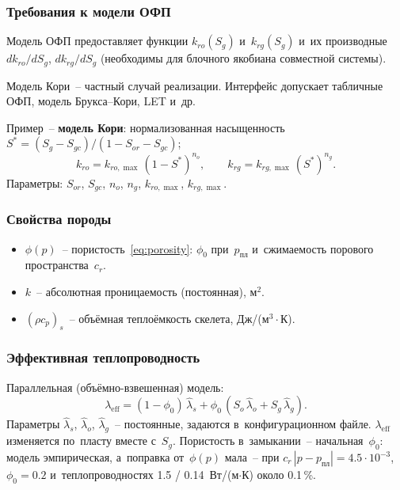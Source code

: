 \documentclass[12pt,a4paper]{article}
\newcommand{\ppl}{p_{\text{пл}}}
\newcommand{\leff}{\lambda_{\mathrm{eff}}}
\begin{document}
\subsubsection{Требования к модели ОФП}

Модель ОФП предоставляет функции $k_{ro}(S_g)$ и~$k_{rg}(S_g)$
и~их производные~$dk_{ro}/dS_g$, $dk_{rg}/dS_g$ (необходимы для
блочного якобиана совместной системы).

Модель Кори~-- частный случай реализации. Интерфейс допускает
табличные ОФП, модель Брукса--Кори, LET и~др.

Пример~-- \textbf{модель Кори}:
нормализованная насыщенность $S^* = (S_g - S_{gc})/(1 - S_{or} - S_{gc})$;
\begin{equation}\label{eq:corey}
  k_{ro} = k_{ro,\max}\,(1-S^*)^{n_o}, \qquad
  k_{rg} = k_{rg,\max}\,(S^*)^{n_g}.
\end{equation}
Параметры: $S_{or}$, $S_{gc}$, $n_o$, $n_g$, $k_{ro,\max}$, $k_{rg,\max}$.


\subsubsection{Свойства породы}

\begin{itemize}[nosep]
  \item $\phi(p)$~-- пористость~\eqref{eq:porosity}: $\phi_0$ при~$\ppl$ и~сжимаемость порового пространства~$c_r$.
  \item $k$~-- абсолютная проницаемость (постоянная), м$^2$.
  \item $(\rho c_p)_s$~-- объёмная теплоёмкость скелета,
        Дж/(м$^3\cdot$К).
\end{itemize}


\subsubsection{Эффективная теплопроводность}

Параллельная (объёмно-взвешенная) модель:
\begin{equation}\label{eq:lambda_eff}
  \boxed{
    \leff = (1-\phi_0)\,\hat\lambda_s + \phi_0\,(S_o\,\hat\lambda_o + S_g\,\hat\lambda_g).
  }
\end{equation}
Параметры $\hat\lambda_s$, $\hat\lambda_o$, $\hat\lambda_g$~-- постоянные,
задаются в~конфигурационном файле. $\leff$ изменяется по~пласту вместе
с~$S_g$. Пористость в~замыкании~-- начальная~$\phi_0$: модель
эмпирическая, а~поправка от~$\phi(p)$ мала~-- при
$c_r\,|p - \ppl| = 4.5\cdot10^{-3}$, $\phi_0 = 0.2$ и~теплопроводностях
1.5 / 0.14~Вт/(м$\cdot$К) около 0.1\,\%.
\end{document}
